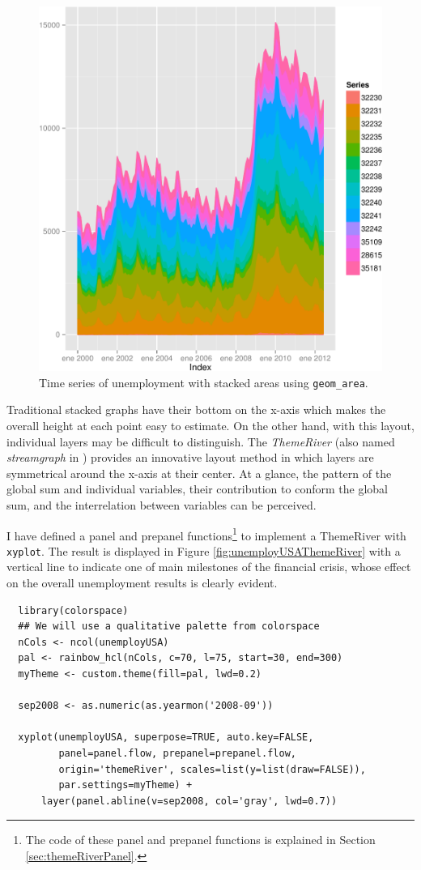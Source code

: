\documentclass[smallroyalvopaper]{memoir}
\begin{document}
\begin{figure}[htbp]
\centering
\includegraphics[width=.9\linewidth]{figs/unemployUSAgeomArea.pdf}
\caption{\label{fig:org0218bb2}
Time series of unemployment with stacked areas using \texttt{geom\_area}.}
\end{figure}

Traditional stacked graphs have their bottom on the x-axis which makes
the overall height at each point easy to estimate. On the other hand,
with this layout, individual layers may be difficult to
distinguish. The \emph{ThemeRiver} \cite{Havre.Hetzler.ea2002} (also named
\emph{streamgraph} in \cite{Byron.Wattenberg2008}) provides an innovative
layout method in which layers are symmetrical around the x-axis at
their center. At a glance, the pattern of the global sum and
individual variables, their contribution to conform the global sum,
and the interrelation between variables can be perceived.

I have defined a panel and prepanel functions\footnote{The code of these panel and prepanel functions is explained
in Section \ref{sec:themeRiverPanel}.} to implement a
ThemeRiver with \texttt{xyplot}. The result is displayed in Figure
\ref{fig:unemployUSAThemeRiver} with a vertical line to indicate
one of main milestones of the financial crisis, whose effect on
the overall unemployment results is clearly evident.
\lstset{language=r,label= ,caption= ,captionpos=b,numbers=none}
\begin{lstlisting}
  library(colorspace)
  ## We will use a qualitative palette from colorspace
  nCols <- ncol(unemployUSA)
  pal <- rainbow_hcl(nCols, c=70, l=75, start=30, end=300)
  myTheme <- custom.theme(fill=pal, lwd=0.2)
  
  sep2008 <- as.numeric(as.yearmon('2008-09'))
  
  xyplot(unemployUSA, superpose=TRUE, auto.key=FALSE,
         panel=panel.flow, prepanel=prepanel.flow,
         origin='themeRiver', scales=list(y=list(draw=FALSE)),
         par.settings=myTheme) +
      layer(panel.abline(v=sep2008, col='gray', lwd=0.7))
\end{lstlisting}
\end{document}
